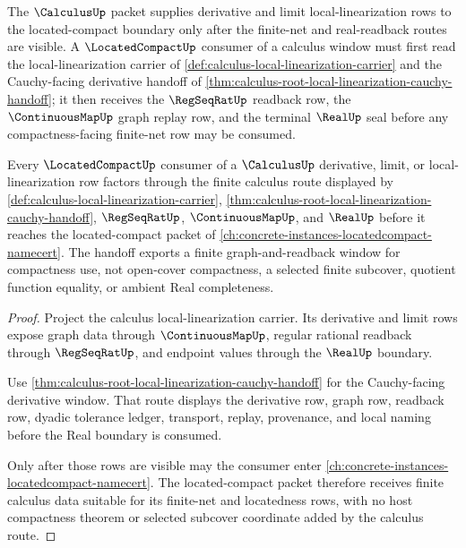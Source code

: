 The $\CalculusUp$ packet supplies derivative and limit local-linearization rows to the located-compact boundary only after the finite-net and real-readback routes are visible. A $\LocatedCompactUp$ consumer of a calculus window must first read the local-linearization carrier of \autoref{def:calculus-local-linearization-carrier} and the Cauchy-facing derivative handoff of \autoref{thm:calculus-root-local-linearization-cauchy-handoff}; it then receives the $\RegSeqRatUp$ readback row, the $\ContinuousMapUp$ graph replay row, and the terminal $\RealUp$ seal before any compactness-facing finite-net row may be consumed.

\begin{theorem}
\label{thm:calculus-locatedcompact-dependency-route}
Every $\LocatedCompactUp$ consumer of a $\CalculusUp$ derivative, limit, or local-linearization row factors through the finite calculus route displayed by \autoref{def:calculus-local-linearization-carrier}, \autoref{thm:calculus-root-local-linearization-cauchy-handoff}, $\RegSeqRatUp$, $\ContinuousMapUp$, and $\RealUp$ before it reaches the located-compact packet of \autoref{ch:concrete-instances-locatedcompact-namecert}. The handoff exports a finite graph-and-readback window for compactness use, not open-cover compactness, a selected finite subcover, quotient function equality, or ambient Real completeness.
\end{theorem}
\begin{proof}
Project the calculus local-linearization carrier. Its derivative and limit rows expose graph data through $\ContinuousMapUp$, regular rational readback through $\RegSeqRatUp$, and endpoint values through the $\RealUp$ boundary.

Use \autoref{thm:calculus-root-local-linearization-cauchy-handoff} for the Cauchy-facing derivative window. That route displays the derivative row, graph row, readback row, dyadic tolerance ledger, transport, replay, provenance, and local naming before the Real boundary is consumed.

Only after those rows are visible may the consumer enter \autoref{ch:concrete-instances-locatedcompact-namecert}. The located-compact packet therefore receives finite calculus data suitable for its finite-net and locatedness rows, with no host compactness theorem or selected subcover coordinate added by the calculus route.
\end{proof}
